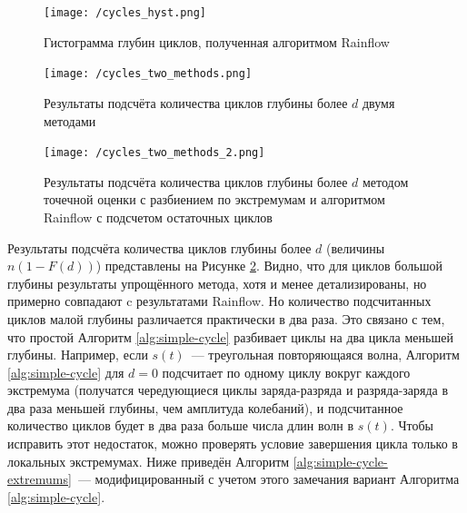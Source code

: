 \begin{figure}[h]
\texttt{[image: /cycles\_hyst.png]}
\caption{Гистограмма глубин циклов, полученная алгоритмом Rainflow}
\centering
\label{fig:cycles-hyst}
\end{figure}


\begin{figure}[h]
\texttt{[image: /cycles\_two\_methods.png]}
\caption{Результаты подсчёта количества циклов глубины более $d$ двумя методами}
\centering
\label{fig:cycles-two-methods}
\end{figure}


\begin{figure}[h]
\texttt{[image: /cycles\_two\_methods\_2.png]}
\caption{Результаты подсчёта количества циклов глубины более $d$ методом точечной оценки с разбиением по экстремумам и алгоритмом Rainflow с подсчетом остаточных циклов}
\centering
\label{fig:cycles-two-methods-2}
\end{figure}

Результаты подсчёта количества циклов глубины более $d$ (величины $n(1 - F(d))$) представлены на Рисунке \ref{fig:cycles-two-methods}.
Видно, что для циклов большой глубины результаты упрощённого метода, хотя и менее детализированы, но примерно совпадают c результатами Rainflow.
Но количество подсчитанных циклов малой глубины различается практически в два раза.
Это связано с тем, что простой Алгоритм \ref{alg:simple-cycle} разбивает циклы на два цикла меньшей глубины.
Например, если $s(t)$~--- треугольная повторяющаяся волна, Алгоритм \ref{alg:simple-cycle} для $d=0$ подсчитает по одному циклу вокруг каждого экстремума (получатся чередующиеся циклы заряда-разряда и разряда-заряда в два раза меньшей глубины, чем амплитуда колебаний), и подсчитанное количество циклов будет в два раза больше числа длин волн в $s(t)$.
Чтобы исправить этот недостаток, можно проверять условие завершения цикла только в локальных экстремумах.
Ниже приведён Алгоритм \ref{alg:simple-cycle-extremums}~--- модифицированный с учетом этого замечания вариант Алгоритма \ref{alg:simple-cycle}.




